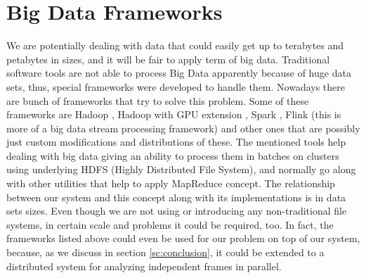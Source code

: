\documentclass[12pt,letterpaper]{report}
\begin{document}
\section{Big Data Frameworks}
\hspace{3em} We are potentially dealing with data that could easily get up to terabytes and petabytes in sizes, and it will be fair to apply term of big data. Traditional software tools are not able to process Big Data apparently because of huge data sets, thus, special frameworks were developed to handle them. Nowadays there are bunch of frameworks that try to solve this problem. Some of these frameworks are Hadoop \cite{hadoop}, Hadoop with GPU extension \cite{hadoopgpu}, Spark \cite{spark}, Flink \cite{flink} (this is more of a big data stream processing framework) and other ones that are possibly just custom modifications and distributions of these. The mentioned tools help dealing with big data giving an ability to process them in batches on clusters using underlying HDFS (Highly Distributed File System), and normally go along with other utilities that help to apply MapReduce concept. The relationship between our system and this concept along with its implementations is in data sets sizes. Even though we are not using or introducing any non-traditional file systems, in certain scale and problems it could be required, too. In fact, the frameworks listed above could even be used for our problem on top of our system, because, as we discuss in section \ref{sc:conclusion}, it could be extended to a distributed system for analyzing independent frames in parallel. 
\end{document}
